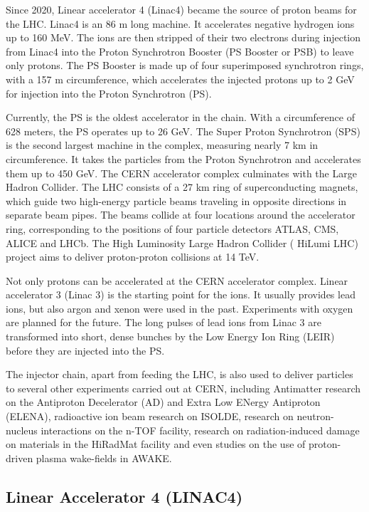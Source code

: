 Since 2020, Linear accelerator 4 (Linac4) became the source of proton beams for the LHC. Linac4 is an 86 \si{\meter} long machine. It accelerates negative hydrogen ions up to 160 \si{\mega \electronvolt}. The ions are then stripped of their two electrons during injection from Linac4 into the Proton Synchrotron Booster (PS Booster or PSB) to leave only protons. The PS Booster is made up of four superimposed synchrotron rings, with a 157 \si{\meter} circumference, which accelerates the injected protons up to 2 GeV for injection into the Proton Synchrotron (PS). 

Currently, the PS is the oldest accelerator in the chain. With a circumference of 628 meters, the PS operates up to 26 \si{\giga \electronvolt}. The Super Proton Synchrotron (SPS) is the second largest machine in the complex, measuring nearly 7 \si{\kilo \meter} in circumference. It takes the particles from the Proton Synchrotron and accelerates them up to 450 \si{\giga \electronvolt}. The CERN accelerator complex culminates with the Large Hadron Collider. The LHC consists of a 27 \si{\kilo \meter} ring of superconducting magnets, which guide two high-energy particle beams traveling in opposite directions in separate beam pipes. The beams collide at four locations around the accelerator ring, corresponding to the positions of four particle detectors ATLAS, CMS, ALICE and LHCb. The High Luminosity Large Hadron Collider ( HiLumi LHC) project aims to deliver proton-proton collisions at 14 \si{\tera \electronvolt}.

Not only protons can be accelerated at the CERN accelerator complex. Linear accelerator 3 (Linac 3) is the starting point for the ions. It usually provides lead ions, but also argon and xenon were used in the past. Experiments with oxygen are planned for the future. The long pulses of lead ions from Linac 3 are transformed into short, dense bunches by the Low Energy Ion Ring (LEIR) before they are injected into the PS. 

The injector chain, apart from feeding the LHC, is also used to deliver particles to several other experiments carried out at CERN, including Antimatter research on the Antiproton Decelerator (AD) and Extra Low ENergy Antiproton (ELENA), radioactive ion beam research on ISOLDE, research on neutron-nucleus interactions on the n-TOF facility, research on radiation-induced damage on materials in the HiRadMat facility and even studies on the use of proton-driven plasma wake-fields in AWAKE. 

\subsection{Linear Accelerator 4 (LINAC4)}
\label{sec:LINAC4}

